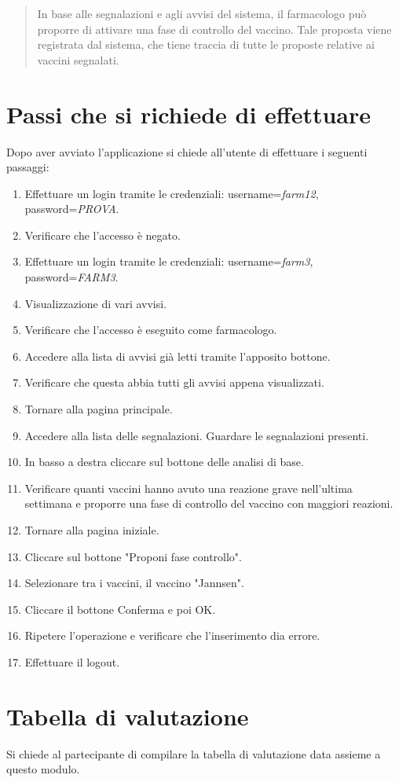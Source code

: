 \documentclass{article}
\begin{document}
\begin{quotation}
{{        In base alle segnalazioni e agli avvisi del sistema, il farmacologo può proporre di attivare una fase di controllo del vaccino. Tale proposta viene registrata dal sistema, che tiene traccia di tutte le proposte relative ai vaccini segnalati.
    }}
    \end{quotation}

\section{Passi che si richiede di effettuare}

    Dopo aver avviato l'applicazione si chiede all'utente di effettuare i seguenti passaggi:
    \begin{enumerate}
        \item Effettuare un login tramite le credenziali: username=\textit{farm12}, password=\textit{PROVA}.
        \item Verificare che l'accesso è negato.
        \item Effettuare un login tramite le credenziali: username=\textit{farm3}, password=\textit{FARM3}.
        \item Visualizzazione di vari avvisi.
        \item Verificare che l'accesso è eseguito come farmacologo.
        \item Accedere alla lista di avvisi già letti tramite l'apposito bottone.
        \item Verificare che questa abbia tutti gli avvisi appena visualizzati.
        \item Tornare alla pagina principale.
        \item Accedere alla lista delle segnalazioni. Guardare le segnalazioni presenti. 
        \item In basso a destra cliccare sul bottone delle analisi di base.
        \item Verificare quanti vaccini hanno avuto una reazione grave nell'ultima settimana e proporre una fase di controllo del vaccino con maggiori reazioni.
        \item Tornare alla pagina iniziale.
        \item Cliccare sul bottone "Proponi fase controllo".
        \item Selezionare tra i vaccini, il vaccino "Jannsen".
        \item Cliccare il bottone Conferma e poi OK.
        \item Ripetere l'operazione e verificare che l'inserimento dia errore.
        \item Effettuare il logout.
    \end{enumerate}

\section{Tabella di valutazione}
    Si chiede al partecipante di compilare la tabella di valutazione data assieme a questo modulo.
\end{document}
